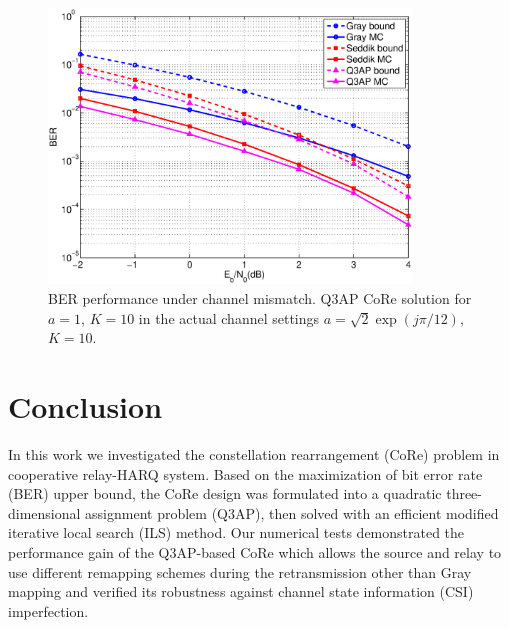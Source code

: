\documentclass[conference]{IEEEtran}
\begin{document}
\begin{figure}[!t]
    \centering
    \includegraphics[width=3.8in]{./figs/mismatch.eps}
    \caption{BER performance under channel mismatch. Q3AP CoRe solution for
    $a=1$, $K=10$ in the actual channel settings $a = \sqrt{2}\exp(j\pi/12)$, $K
    = 10$.}
    \label{fig:mismatch}
\end{figure}

\section{Conclusion}
\label{sec:conclusion}
In this work we investigated the constellation rearrangement (CoRe) problem in
cooperative relay-HARQ system. Based on the maximization of bit error rate (BER)
upper bound, the CoRe design was formulated into a quadratic three-dimensional
assignment problem (Q3AP), then solved with an efficient modified iterative
local search (ILS) method. Our numerical tests demonstrated the performance gain
of the Q3AP-based CoRe which allows the source and relay to use different
remapping schemes during the retransmission other than Gray mapping and
verified its robustness against channel state information (CSI) imperfection.










\end{document}
